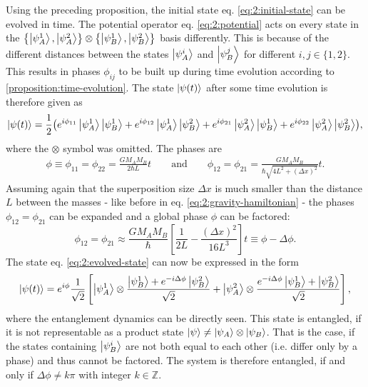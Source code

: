Using the preceding proposition, the initial state eq. \eqref{eq:2:initial-state} can be evolved in time.
The potential operator eq. \eqref{eq:2:potential} acts on every state in the $\left\{ \ket{\psi_A^1}, \ket{\psi_A^2} \right\}\otimes \left\{ \ket{\psi_B^1}, \ket{\psi_B^2} \right\}$ basis differently. This is because of the different distances between the states $\ket{\psi_A^i}$ and $\ket{\psi_B^j}$ for different $i,j \in \{1, 2\}$. This results in phases $\phi_{ij}$ to be built up during time evolution according to \cref{proposition:time-evolution}.
The state $\ket{\psi(t)}$ after some time evolution is therefore given as
\begin{equation}\label{eq:2:evolved-state}
  \ket{\psi(t)} = \frac{1}{2}\bigl(
    e^{i\phi_{11}} \ket{\psi_A^1}\ket{\psi_B^1} 
    + e^{i\phi_{12}} \ket{\psi_A^1}\ket{\psi_B^2}
    + e^{i\phi_{21}} \ket{\psi_A^2}\ket{\psi_B^1} 
    + e^{i\phi_{22}} \ket{\psi_A^2}\ket{\psi_B^2} \bigr) ,
\end{equation}
where the $\otimes$ symbol was omitted. The phases are
\begin{align}
  \phi \equiv \phi_{11} = \phi_{22} = \frac{G M_A M_B}{2\hbar L}t 
  \qquad \text{and} \qquad 
  \phi_{12} = \phi_{21} = \frac{G M_A M_B}{\hbar \sqrt{4L^2 + (\Delta x)^2}}t .
\end{align}
Assuming again that the superposition size $\Delta x$ is much smaller than the distance $L$ between the masses - like before in eq. \eqref{eq:2:gravity-hamiltonian} - the phases $\phi_{12}=\phi_{21}$ can be expanded and a global phase $\phi$ can be factored:
\begin{equation}\label{eq:2:definition-delta-phi}
  \phi_{12} = \phi_{21} \approx \frac{GM_AM_B}{\hbar} \left[ \frac{1}{2L} - \frac{(\Delta x)^2}{16 L^3} \right] t \equiv \phi - \Delta\phi .
\end{equation}
The state eq. \eqref{eq:2:evolved-state} can now be expressed in the form
\begin{equation}
  \ket{\psi(t)} = e^{i\phi}\frac{1}{\sqrt{2}}\left[ 
    \ket{\psi_A^1} \otimes \frac{\ket{\psi_B^1} + e^{-i\Delta\phi} \ket{\psi_B^2}}{\sqrt{2}}
    + \ket{\psi_A^2} \otimes \frac{e^{-i\Delta\phi} \ket{\psi_B^1} + \ket{\psi_B^2}}{\sqrt{2}} \right] ,
\end{equation}
where the entanglement dynamics can be directly seen. This state is entangled, if it is not representable as a product state $\ket{\psi} \neq \ket{\psi_A}\otimes\ket{\psi_B}$. That is the case, if the states containing $\ket{\psi_B^i}$ are not both equal to each other (i.e. differ only by a phase) and thus cannot be factored. 
The system is therefore entangled, if and only if $\Delta\phi \neq k\pi$ with integer $k \in \mathbb{Z}$.


